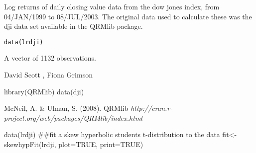 \begin{Description}\relax
Log returns of daily closing value data from the dow
jones index, from 04/JAN/1999 to 08/JUL/2003. The original data used
to calculate these was the dji data set available in the QRMlib package.
\end{Description}
\begin{Usage}
\begin{verbatim}
data(lrdji)
\end{verbatim}
\end{Usage}
\begin{Format}\relax
A vector of 1132 observations.
\end{Format}
\begin{Author}\relax
David Scott , Fiona Grimson
\end{Author}
\begin{Source}\relax
library(QRMlib)
data(dji)
\end{Source}
\begin{References}\relax
McNeil, A. \& Ulman, S. (2008).
QRMlib \emph{http://cran.r-project.org/web/packages/QRMlib/index.html}
\end{References}
\begin{Examples}
\begin{ExampleCode}
data(lrdji)
##fit a skew hyperbolic students t-distribution to the data
fit<-skewhypFit(lrdji, plot=TRUE, print=TRUE)
\end{ExampleCode}
\end{Examples}

